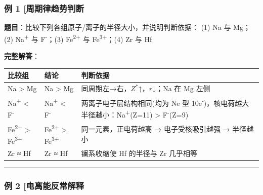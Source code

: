 \subsubsection{例 1 {[}周期律趋势判断}\label{ux4f8b-1-ux5468ux671fux5f8bux8d8bux52bfux5224ux65ad}

\textbf{题目}：比较下列各组原子/离子的半径大小，并说明判断依据：
(1) Na 与 Mg；(2) Na\textsuperscript{+} 与 F\textsuperscript{-}；(3) Fe\textsuperscript{2+} 与 Fe\textsuperscript{3+}；(4) Zr 与 Hf

\textbf{完整解答}：

{\def\LTcaptype{none} %
\begin{longtable}[]{@{}
  >{\raggedright\arraybackslash}p{}
  >{\centering\arraybackslash}p{}
  >{\raggedright\arraybackslash}p{}@{}}
\toprule\noalign{}
\begin{minipage}[b]{\linewidth}\raggedright
比较组
\end{minipage} & \begin{minipage}[b]{\linewidth}\centering
结论
\end{minipage} & \begin{minipage}[b]{\linewidth}\raggedright
判断依据
\end{minipage} \\
\midrule\noalign{}
\endhead
\bottomrule\noalign{}
\endlastfoot
Na \textgreater{} Mg & Na \textgreater{} Mg & 同周期左→右，\(Z^*\)↑，\(r\)↓；Na 在 Mg 左侧 \\
Na\textsuperscript{+} \textless{} F\textsuperscript{-} & Na\textsuperscript{+} \textless{} F\textsuperscript{-} & 两离子电子层结构相同(均为 Ne 型 10e\textsuperscript{-})，核电荷越大半径越小：Na\textsuperscript{+}(Z=11) \textgreater{} F\textsuperscript{-}(Z=9) \\
Fe\textsuperscript{2+} \textgreater{} Fe\textsuperscript{3+} & Fe\textsuperscript{2+} \textgreater{} Fe\textsuperscript{3+} & 同一元素，正电荷越高 → 电子受核吸引越强 → 半径越小 \\
Zr ≈ Hf & Zr ≈ Hf & 镧系收缩使 Hf 的半径与 Zr 几乎相等 \\
\end{longtable}
}

\begin{center}\rule{0.5\linewidth}{0.5pt}\end{center}

\subsubsection{例 2 {[}电离能反常解释}\label{ux4f8b-2-ux7535ux79bbux80fdux53cdux5e38ux89e3ux91ca}

